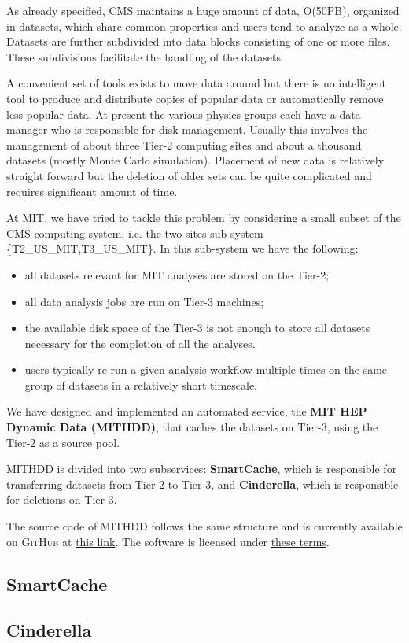 As already specified, CMS maintains a huge amount of data, O(50PB), organized 
in datasets, which share common properties and users tend to analyze as a whole. 
Datasets are further subdivided into data blocks consisting of one or more files. These 
subdivisions facilitate the handling of the datasets.

A convenient set of tools exists to move data around but there is no intelligent tool to produce and
distribute copies of popular data or automatically remove less popular data. At present the various 
physics groups each have a data manager who is responsible for disk management. Usually this involves 
the management of about three Tier-2 computing sites and about a thousand 
datasets (mostly Monte Carlo simulation). Placement of new data is relatively straight forward but the 
deletion of older sets can be quite complicated and requires significant amount of time.

At MIT, we have tried to tackle this problem by considering a small subset of the CMS computing system, 
i.e. the two sites sub-system \{T2\_US\_MIT,T3\_US\_MIT\}. In this sub-system we have the following:

\begin{itemize}
	\item all datasets relevant for MIT analyses are stored on the Tier-2;
	\item all data analysis jobs are run on Tier-3 machines;
	\item the available disk space of the Tier-3 is not enough to store all datasets necessary for 
	the completion of all the analyses.
	\item users typically re-run a given analysis workflow multiple times on the same group of datasets in 
	a relatively short timescale.
\end{itemize}
We have designed and implemented an automated service, the \textbf{MIT HEP Dynamic Data (MITHDD)}, that 
caches the datasets on Tier-3, using the Tier-2 as a source pool. 

MITHDD is divided into two subservices: \textbf{SmartCache}, which is responsible for transferring 
datasets from Tier-2 to Tier-3, and \textbf{Cinderella}, which is responsible for deletions on Tier-3.

The source code of MITHDD follows the same structure and is currently available on \textsc{GitHub} at 
\href{https://github.com/cpausmit/DynamicData}{\textcolor{Mahogany}{this link}}. The software is licensed
under \href{http://opensource.org/licenses/MIT}{\textcolor{Mahogany}{these terms}}.

\subsection{SmartCache}\label{subsec:smartcache}


\subsection{Cinderella}\label{subsec:cinderella}






